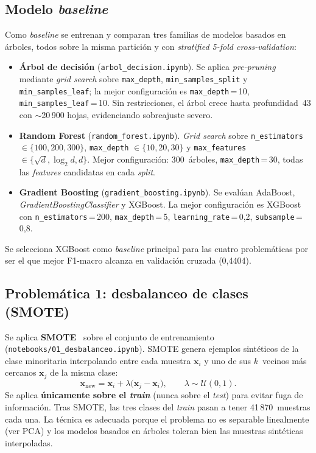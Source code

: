 \documentclass[11pt,a4paper]{article}
\begin{document}
\subsection{Modelo \textit{baseline}}

Como \textit{baseline} se entrenan y comparan tres familias de modelos basados en árboles, todos sobre la misma partición y con \textit{stratified 5-fold cross-validation}:

\begin{itemize}
    \item \textbf{Árbol de decisión} (\texttt{arbol\_decision.ipynb}). Se aplica \textit{pre-pruning} mediante \textit{grid search} sobre \texttt{max\_depth}, \texttt{min\_samples\_split} y \texttt{min\_samples\_leaf}; la mejor configuración es \texttt{max\_depth}\,=\,10, \texttt{min\_samples\_leaf}\,=\,10. Sin restricciones, el árbol crece hasta profundidad~43 con $\sim$20\,900 hojas, evidenciando sobreajuste severo.
    \item \textbf{Random Forest} (\texttt{random\_forest.ipynb}). \textit{Grid search} sobre \texttt{n\_estimators} $\in\{100,200,300\}$, \texttt{max\_depth} $\in\{10,20,30\}$ y \texttt{max\_features} $\in\{\sqrt{d}, \log_2 d, d\}$. Mejor configuración: 300~árboles, \texttt{max\_depth}\,=\,30, todas las \textit{features} candidatas en cada \textit{split}.
    \item \textbf{Gradient Boosting} (\texttt{gradient\_boosting.ipynb}). Se evalúan AdaBoost, \textit{GradientBoostingClassifier} y XGBoost. La mejor configuración es XGBoost con \texttt{n\_estimators}\,=\,200, \texttt{max\_depth}\,=\,5, \texttt{learning\_rate}\,=\,0{,}2, \texttt{subsample}\,=\,0{,}8.
\end{itemize}

Se selecciona XGBoost como \textit{baseline} principal para las cuatro problemáticas por ser el que mejor F1-macro alcanza en validación cruzada (0{,}4404).

\subsection{Problemática 1: desbalanceo de clases (SMOTE)}

Se aplica \textbf{SMOTE}~\cite{ref_smote} sobre el conjunto de entrenamiento (\texttt{notebooks/01\_desbalanceo.ipynb}). SMOTE genera ejemplos sintéticos de la clase minoritaria interpolando entre cada muestra $\bm{x}_i$ y uno de sus $k$~vecinos más cercanos $\bm{x}_j$ de la misma clase:
\begin{equation}
   \bm{x}_{\text{new}} = \bm{x}_i + \lambda\bigl(\bm{x}_j - \bm{x}_i\bigr), \qquad \lambda \sim \mathcal{U}(0, 1).
   \label{eq:smote}
\end{equation}
Se aplica \textbf{únicamente sobre el \textit{train}} (nunca sobre el \textit{test}) para evitar fuga de información. Tras SMOTE, las tres clases del \textit{train} pasan a tener 41\,870~muestras cada una. La técnica es adecuada porque el problema no es separable linealmente (ver PCA) y los modelos basados en árboles toleran bien las muestras sintéticas interpoladas.
\end{document}
